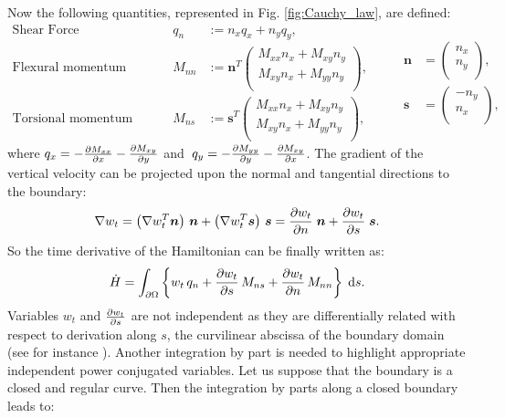 \documentclass[preprint,12pt]{elsarticle}
\newcommand{\secondReviewer}[1]{\textcolor{blue!80!black}{#1}}
\begin{document}
Now the following quantities, represented in Fig. \ref{fig:Cauchy_law}, are defined: 
\begin{equation}
\label{eq:QnMnnMns}
\begin{aligned}
\text{Shear Force}& \; \; \quad &q_{n} &:= n_x q_x + n_y q_y,   \\
\text{Flexural momentum}& \quad 
&M_{nn} &:= \bm{n}^T	
\begin{pmatrix}
M_{xx} n_x + M_{xy} n_y \\
M_{xy} n_x + M_{yy} n_y \\
\end{pmatrix}, \\
\text{Torsional momentum}& \quad &M_{ns} &:= \bm{s}^T	
\begin{pmatrix}
M_{xx} n_x + M_{xy} n_y \\
M_{xy} n_x + M_{yy} n_y \\
\end{pmatrix}, 
\end{aligned} \qquad
\begin{aligned}
\bm{n} &= 
\begin{pmatrix}
n_x \\
n_y \\
\end{pmatrix}, \\
\bm{s} &= 
\begin{pmatrix}
-n_y \\
n_x \\
\end{pmatrix},
\end{aligned}
\end{equation}
where $q_x = - \diffp{M_{xx}}{x} -\diffp{M_{xy}}{y}$ and $\; q_y = - \diffp{M_{yy}}{y} -\diffp{M_{xy}}{x}$. The gradient of the vertical velocity can be projected upon the normal and tangential directions to the boundary:
\begin{equation}
\label{eq:gr_dec_ns}
\nabla w_t = \left(\nabla w_t^T \bm{n} \right) \,\bm{n} + \left(\nabla w_t^T \bm{s} \right) \, \bm{s} = \diffp{w_t}{n} \; \bm{n} +   \diffp{w_t}{s} \; \bm{s}.
\end{equation}
So the time derivative of the Hamiltonian can be finally written as:
\begin{equation}
\dot{H} = \int_{\partial \Omega} \left\{ w_t \, q_n + \diffp{w_t}{s} \, M_{ns} + \diffp{w_t}{n} \, M_{nn}\right\} \d{s}.
\end{equation}
\secondReviewer{Variables $w_t$ and $\diffp{w_t}{s}$ are not independent as they are differentially related with respect to derivation along $s$, the curvilinear abscissa of the boundary domain (see for instance \cite{timoshenko1959theory})}. Another integration by part is needed to highlight appropriate \secondReviewer{independent} power conjugated variables. Let us suppose that the boundary is a closed and regular curve. Then the integration by parts along a closed boundary leads to:
\end{document}
